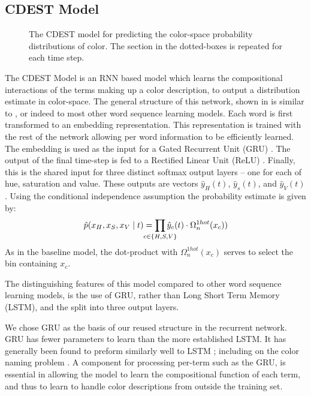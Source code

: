 \documentclass[11pt,a4paper]{article}
\newcommand{\parencite}{\citep}
\newcommand{\textcite}{\cite}
\begin{document}
\subsection{CDEST Model}

\begin{figure}
	\resizebox{\columnwidth}{!}{}
	
	\caption{\label{network}
		The CDEST model for predicting the color-space probability distributions of color.
		The section in the dotted-boxes is repeated for each time step.
	}
\end{figure}

The CDEST Model is an RNN based model which learns the compositional interactions of the terms making up a color description, to output a distribution estimate in color-space.
The general structure of this network, shown in  is similar to \textcite{2016arXiv160603821M}, or indeed to most other word sequence learning models.
Each word is first transformed to an embedding representation.
This representation is trained with the rest of the network allowing per word information to be efficiently learned.
The embedding is used as the input for a Gated Recurrent Unit (GRU)  \parencite{cho2014properties}.
The output of the final time-step is fed to a Rectified Linear Unit (ReLU)  \parencite{dahl2013reludropout}.
Finally, this is the shared input for three distinct softmax output layers -- one for each of hue, saturation and value.
These outputs are vectors $\hat{y}_{H}(t)$, $\hat{y}_{s}(t)$, and $\hat{y}_{V}(t)$.
Using the conditional independence assumption the probability estimate is given by:
\[
	\hat{p}(x_H,x_S,x_V\mid t) = \displaystyle\prod_{
		\mathclap{c\in {\{H,S,V\}}}}
	 \hat{y}_{c}(t)\cdot \Omega_{n}^{1hot}(x_c))
\]
As in the baseline model, the dot-product with $\Omega_{n}^{1hot}(x_c)$ serves to select the bin containing $x_c$.

The distinguishing features of this model compared to other word sequence learning models, is the use of GRU, rather than Long Short Term Memory (LSTM), and the split into three output layers.

We chose GRU as the basis of our reused structure in the recurrent network.
GRU has fewer parameters to learn than the more established LSTM.
It has generally been found to preform similarly well to LSTM \parencite{chung2014empirical};
including on the color naming problem \parencite{2016arXiv160603821M}.
A component for processing per-term such as the GRU, is essential in allowing the model to learn the compositional function of each term,  and thus to learn to handle color descriptions from outside the training set.
\end{document}
